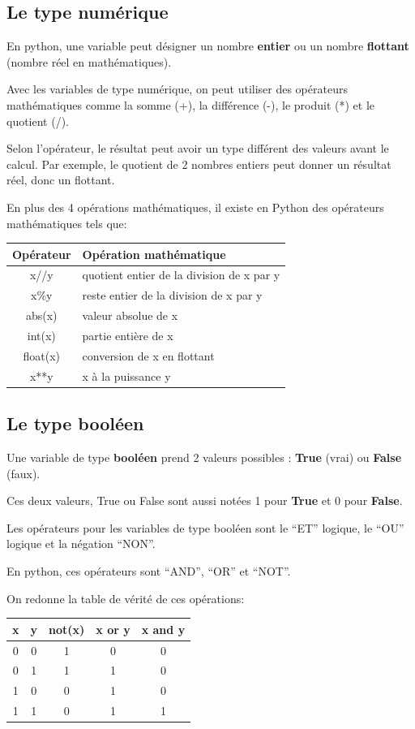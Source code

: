 \documentclass[11pt]{article}
\begin{document}
\hypertarget{le-type-numuxe9rique}{%
\subsection{Le type numérique}\label{le-type-numuxe9rique}}

En python, une variable peut désigner un nombre \textbf{entier} ou un
nombre \textbf{flottant} (nombre réel en mathématiques).

Avec les variables de type numérique, on peut utiliser des opérateurs
mathématiques comme la somme (+), la différence (-), le produit (*) et
le quotient (/).

Selon l'opérateur, le résultat peut avoir un type différent des valeurs
avant le calcul. Par exemple, le quotient de 2 nombres entiers peut
donner un résultat réel, donc un flottant.

En plus des 4 opérations mathématiques, il existe en Python des
opérateurs mathématiques tels que:

\begin{longtable}[]{@{}cl@{}}
\toprule
Opérateur & Opération mathématique\tabularnewline
\midrule
\endhead
x//y & quotient entier de la division de x par y\tabularnewline
x\%y & reste entier de la division de x par y\tabularnewline
abs(x) & valeur absolue de x\tabularnewline
int(x) & partie entière de x\tabularnewline
float(x) & conversion de x en flottant\tabularnewline
x**y & x à la puissance y\tabularnewline
\bottomrule
\end{longtable}

    \hypertarget{le-type-booluxe9en}{%
\subsection{Le type booléen}\label{le-type-booluxe9en}}

Une variable de type \textbf{booléen} prend 2 valeurs possibles :
\textbf{True} (vrai) ou \textbf{False} (faux).

Ces deux valeurs, True ou False sont aussi notées 1 pour \textbf{True}
et 0 pour \textbf{False}.

Les opérateurs pour les variables de type booléen sont le ``ET''
logique, le ``OU'' logique et la négation ``NON''.

En python, ces opérateurs sont ``AND'', ``OR'' et ``NOT''.

On redonne la table de vérité de ces opérations:

\begin{longtable}[]{@{}ccccc@{}}
\toprule
x & y & not(x) & x or y & x and y\tabularnewline
\midrule
\endhead
0 & 0 & 1 & 0 & 0\tabularnewline
0 & 1 & 1 & 1 & 0\tabularnewline
1 & 0 & 0 & 1 & 0\tabularnewline
1 & 1 & 0 & 1 & 1\tabularnewline
\bottomrule
\end{longtable}
\end{document}
